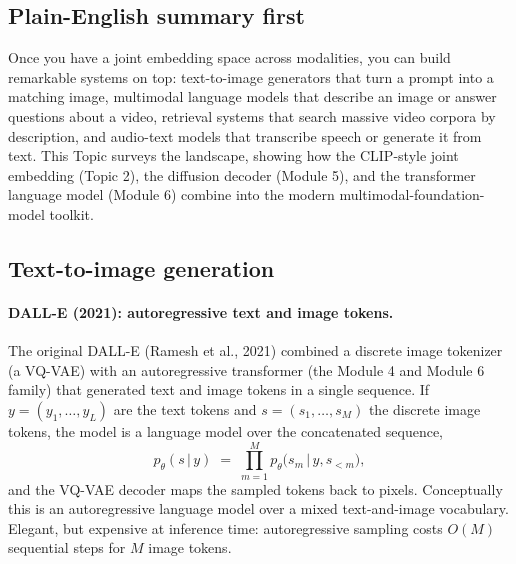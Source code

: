 \documentclass[11pt]{article}
\newcommand{\given}{\,\vert\,}
\theoremstyle{remark}
\begin{document}
\subsection*{Plain-English summary first}
Once you have a joint embedding space across modalities, you can build remarkable systems on top: text-to-image generators that turn a prompt into a matching image, multimodal language models that describe an image or answer questions about a video, retrieval systems that search massive video corpora by description, and audio-text models that transcribe speech or generate it from text. This Topic surveys the landscape, showing how the CLIP-style joint embedding (Topic 2), the diffusion decoder (Module 5), and the transformer language model (Module 6) combine into the modern multimodal-foundation-model toolkit.

\subsection{Text-to-image generation}

\paragraph{DALL-E (2021): autoregressive text and image tokens.}
The original DALL-E (Ramesh et al., 2021) combined a discrete image tokenizer (a VQ-VAE) with an autoregressive transformer (the Module 4 and Module 6 family) that generated text and image tokens in a single sequence. If $y = (y_1, \dots, y_L)$ are the text tokens and $s = (s_1, \dots, s_M)$ the discrete image tokens, the model is a language model over the concatenated sequence,
\[
p_\theta(s \given y) \;=\; \prod_{m=1}^{M} p_\theta\big(s_m \given y, s_{<m}\big),
\]
and the VQ-VAE decoder maps the sampled tokens back to pixels. Conceptually this is an autoregressive language model over a mixed text-and-image vocabulary. Elegant, but expensive at inference time: autoregressive sampling costs $O(M)$ sequential steps for $M$ image tokens.
\end{document}
